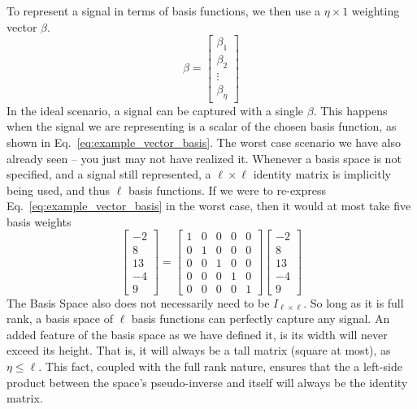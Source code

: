 To represent a signal in terms of basis functions, we then use a $\eta \times 1$ weighting vector $\beta$. 
\begin{equation}
    \beta = 
    \begin{bmatrix}
        \beta_1 \\ \beta_2 \\ \vdots \\ \beta_\eta
    \end{bmatrix}
\end{equation}
In the ideal scenario, a signal can be captured with a single $\beta$. This happens when the signal we are representing is a scalar of the chosen basis function, as shown in Eq.~\ref{eq:example_vector_basis}. The worst case scenario we have also already seen -- you just may not have realized it. Whenever a basis space is not specified, and a signal still represented, a $\ell \times \ell$ identity matrix is implicitly being used, and thus $\ell$ basis functions. If we were to re-express Eq.~\ref{eq:example_vector_basis} in the worst case, then it would at most take five basis weights
\begin{equation}
    \begin{bmatrix}
        -2\\ 8\\ 13\\ -4\\ 9
    \end{bmatrix}
    =
    \begin{bmatrix}
        1 & 0 & 0 & 0 & 0\\0 & 1 & 0 & 0 & 0\\ 0 & 0 & 1 & 0& 0 \\ 0 & 0 & 0 & 1 & 0\\ 0 & 0 & 0 & 0 & 1
    \end{bmatrix}
    \begin{bmatrix}
        -2\\ 8\\ 13\\ -4\\ 9
    \end{bmatrix}
\end{equation}
The Basis Space also does not necessarily need to be $I_{\ell \times \ell}$. So long as it is full rank, a basis space of $\ell$ basis functions can perfectly capture any signal. An added feature of the basis space as we have defined it, is its width will never exceed its height. That is, it will always be a tall matrix (square at most), as $\eta \le \ell$. This fact, coupled with the full rank nature, ensures that the a left-side product between the space's pseudo-inverse and itself will always be the identity matrix.

